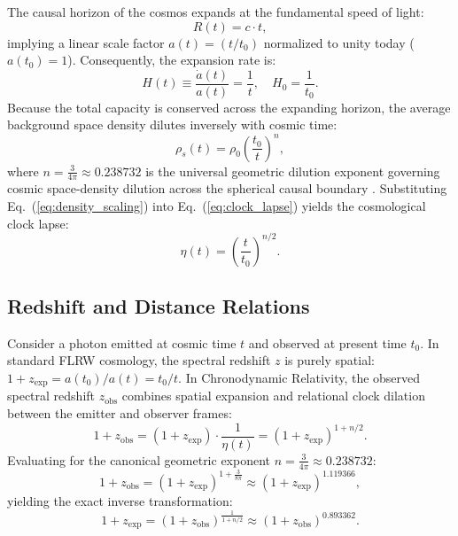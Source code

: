 \documentclass[aps,prd,reprint,superscriptaddress,nofootinbib,floatfix,amsmath,amssymb]{revtex4-2}
\begin{document}
The causal horizon of the cosmos expands at the fundamental speed of light:
\begin{equation}
R(t) = c \cdot t,
\label{eq:linear_horizon}
\end{equation}
implying a linear scale factor $a(t) = (t / t_0)$ normalized to unity today ($a(t_0) = 1$). Consequently, the expansion rate is:
\begin{equation}
H(t) \equiv \frac{\dot{a}(t)}{a(t)} = \frac{1}{t}, \quad H_0 = \frac{1}{t_0}.
\label{eq:hubble_linear}
\end{equation}
Because the total capacity is conserved across the expanding horizon, the average background space density dilutes inversely with cosmic time:
\begin{equation}
\rho_s(t) = \rho_0 \left( \frac{t_0}{t} \right)^n,
\label{eq:density_scaling}
\end{equation}
where $n = \frac{3}{4\pi} \approx 0.238732$ is the universal geometric dilution exponent governing cosmic space-density dilution across the spherical causal boundary \cite{Shreve2026_Foundations}. Substituting Eq.~(\ref{eq:density_scaling}) into Eq.~(\ref{eq:clock_lapse}) yields the cosmological clock lapse:
\begin{equation}
\eta(t) = \left( \frac{t}{t_0} \right)^{n/2}.
\label{eq:eta_time}
\end{equation}

\subsection{Redshift and Distance Relations}

Consider a photon emitted at cosmic time $t$ and observed at present time $t_0$. In standard FLRW cosmology, the spectral redshift $z$ is purely spatial: $1+z_{\text{exp}} = a(t_0)/a(t) = t_0/t$. In Chronodynamic Relativity, the observed spectral redshift $z_{\text{obs}}$ combines spatial expansion and relational clock dilation between the emitter and observer frames:
\begin{equation}
1 + z_{\text{obs}} = (1 + z_{\text{exp}}) \cdot \frac{1}{\eta(t)} = (1 + z_{\text{exp}})^{1 + n/2}.
\label{eq:z_obs_rel}
\end{equation}
Evaluating for the canonical geometric exponent $n = \frac{3}{4\pi} \approx 0.238732$:
\begin{equation}
1 + z_{\text{obs}} = (1 + z_{\text{exp}})^{1 + \frac{3}{8\pi}} \approx (1 + z_{\text{exp}})^{1.119366},
\label{eq:z_conversion}
\end{equation}
yielding the exact inverse transformation:
\begin{equation}
1 + z_{\text{exp}} = (1 + z_{\text{obs}})^{\frac{1}{1 + n/2}} \approx (1 + z_{\text{obs}})^{0.893362}.
\label{eq:z_exp_inv}
\end{equation}
\end{document}
